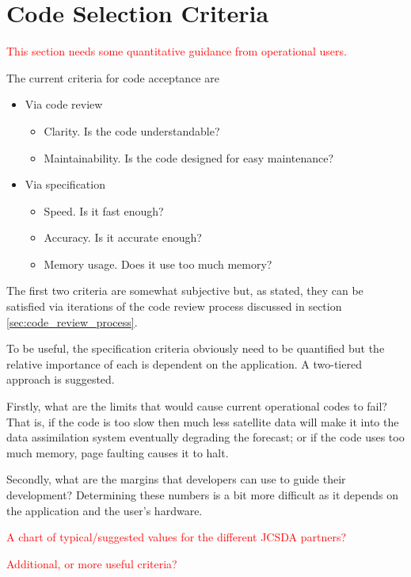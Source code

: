 \section{Code Selection Criteria}
\label{sec:code_selection_criteria}
\textcolor{red}{This section needs some quantitative guidance from operational users.}

The current criteria for code acceptance are
\begin{itemize}
  \item Via code review
  \begin{itemize}
    \item Clarity. Is the code understandable?
    \item Maintainability. Is the code designed for easy maintenance?
  \end{itemize}
  \item Via specification
  \begin{itemize}
    \item Speed. Is it fast enough?
    \item Accuracy. Is it accurate enough?
    \item Memory usage. Does it use too much memory?
  \end{itemize}
\end{itemize}
The first two criteria are somewhat subjective but, as stated, they can be satisfied via iterations of the code review process discussed in section \ref{sec:code_review_process}.

To be useful, the specification criteria obviously need to be quantified but the relative importance of each is dependent on the application. A two-tiered approach is suggested.

Firstly, what are the limits that would cause current operational codes to fail? That is, if the code is too slow then much less satellite data will make it into the data assimilation system eventually degrading the forecast; or if the code uses too much memory, page faulting causes it to halt.

Secondly, what are the margins that developers can use to guide their development? Determining these numbers is a bit more difficult as it depends on the application and the user's hardware.

\textcolor{red}{A chart of typical/suggested values for the different JCSDA partners?}

\textcolor{red}{Additional, or more useful criteria?}


